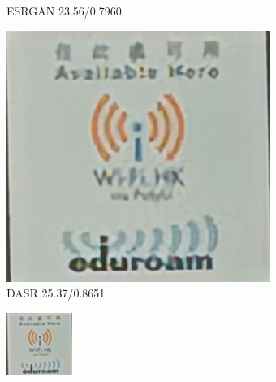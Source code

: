 \begin{figure}[htbp]
\begin{subfigure}{0.3\textwidth}
        \caption{ESRGAN 23.56/0.7960} 
    \end{subfigure}
    \hfill
    \begin{subfigure}{0.3\textwidth}
        \includegraphics[width=\linewidth]{imgs/DASR_25.37_0.8651_Canon_001.png}
        \caption{DASR 25.37/0.8651} 
    \end{subfigure}
    \begin{subfigure}{0.3\textwidth}
        \includegraphics[width=\linewidth]{imgs/LR_Canon_001.png}

\end{subfigure}
\end{figure}

